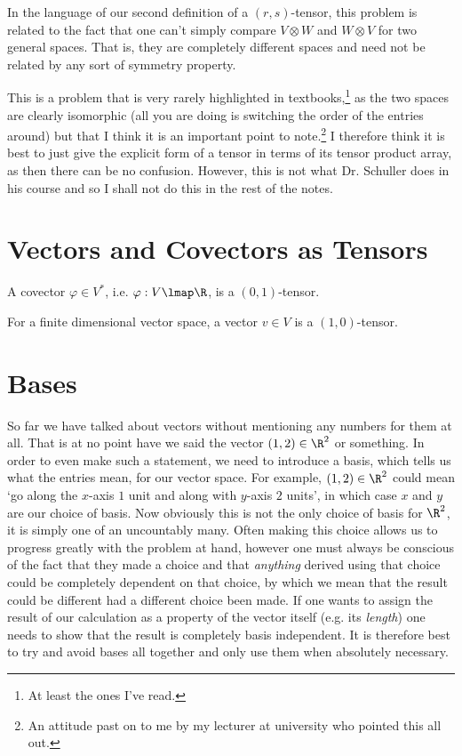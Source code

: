     In the language of our second definition of a $(r,s)$-tensor, this problem is related to the fact that one can't simply compare $V\otimes W$ and $W\otimes V$ for two general spaces. That is, they are completely different spaces and need not be related by any sort of symmetry property. 
    
    This is a problem that is very rarely highlighted in textbooks,\footnote{At least the ones I've read.} as the two spaces are clearly isomorphic (all you are doing is switching the order of the entries around) but that I think it is an important point to note.\footnote{An attitude past on to me by my lecturer at university who pointed this all out.} I therefore think it is best to just give the explicit form of a tensor in terms of its tensor product array, as then there can be no confusion. However, this is not what Dr. Schuller does in his course and so I shall not do this in the rest of the notes. 
\er 

\section{Vectors and Covectors as Tensors}

\bc 
    A covector $\varphi\in V^*$, i.e. $\varphi:V \lmap \R$, is a $(0,1)$-tensor. 
\ec 

\bc 
    For a finite dimensional vector space, a vector $v\in V $ is a $(1,0)$-tensor.
\ec 

\section{Bases}

So far we have talked about vectors without mentioning any numbers for them at all. That is at no point have we said the vector $(1,2)\in\R^2$ or something. In order to even make such a statement, we need to introduce a basis, which tells us what the entries mean, for our vector space. For example, $(1,2)\in\R^2$ could mean `go along the $x$-axis $1$ unit and along with $y$-axis $2$ units', in which case $x$ and $y$ are our choice of basis. Now obviously this is not the only choice of basis for $\R^2$, it is simply one of an uncountably many. Often making this choice allows us to progress greatly with the problem at hand, however one must always be conscious of the fact that they made a choice and that \textit{anything} derived using that choice could be completely dependent on that choice, by which we mean that the result could be different had a different choice been made. If one wants to assign the result of our calculation as a property of the vector itself (e.g. its \textit{length}) one needs to show that the result is completely basis independent. It is therefore best to try and avoid bases all together and only use them when absolutely necessary. 

